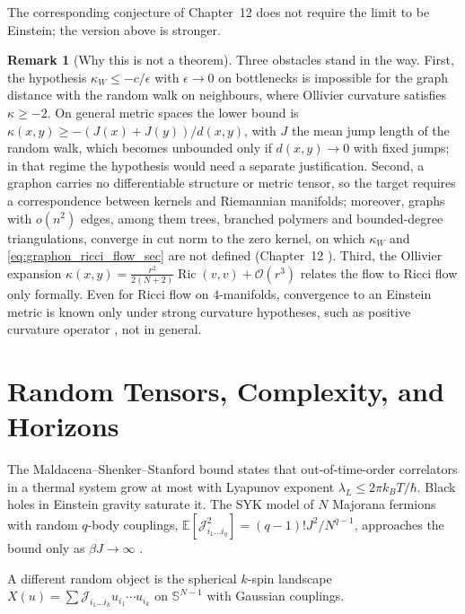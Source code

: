 \documentclass[11pt,a4paper,reqno]{amsart}
\theoremstyle{definition}
\newtheorem{remark}[theorem]{Remark}
\numberwithin{equation}{section}
\providecommand{\Sph}{\mathbb{S}}
\newcommand{\Ric}{\operatorname{Ric}}
\begin{document}
The corresponding conjecture of Chapter~12 does not require the limit to be Einstein; the version above is stronger.

\begin{remark}[Why this is not a theorem]
Three obstacles stand in the way. First, the hypothesis $\kappa_W \le -c/\epsilon$ with $\epsilon \to 0$ on bottlenecks is impossible for the graph distance with the random walk on neighbours, where Ollivier curvature satisfies $\kappa \ge -2$. On general metric spaces the lower bound is $\kappa(x,y) \ge -(J(x) + J(y))/d(x,y)$, with $J$ the mean jump length of the random walk, which becomes unbounded only if $d(x,y) \to 0$ with fixed jumps; in that regime the hypothesis would need a separate justification. Second, a graphon carries no differentiable structure or metric tensor, so the target requires a correspondence between kernels and Riemannian manifolds; moreover, graphs with $o(n^2)$ edges, among them trees, branched polymers and bounded-degree triangulations, converge in cut norm to the zero kernel, on which $\kappa_W$ and \eqref{eq:graphon_ricci_flow_sec} are not defined (Chapter~12 \cite{silvafilho2026grand}). Third, the Ollivier expansion $\kappa(x,y) = \frac{r^2}{2(N+2)}\Ric(v,v) + \mathcal{O}(r^3)$ \cite{ollivier2009ricci} relates the flow to Ricci flow only formally. Even for Ricci flow on $4$-manifolds, convergence to an Einstein metric is known only under strong curvature hypotheses, such as positive curvature operator \cite{hamilton1986}, not in general.
\end{remark}

\section{Random Tensors, Complexity, and Horizons}
\label{sec:horizon_scrambling}

The Maldacena--Shenker--Stanford bound \cite{maldacena2016bound} states that out-of-time-order correlators in a thermal system grow at most with Lyapunov exponent $\lambda_L \le 2\pi k_B T/\hbar$. Black holes in Einstein gravity saturate it. The SYK model \cite{sachdev1993, kitaev2015simple} of $N$ Majorana fermions with random $q$-body couplings, $\mathbb{E}[\mathcal{J}^2_{i_1\dots i_q}] = (q-1)!J^2/N^{q-1}$, approaches the bound only as $\beta J \to \infty$ \cite{maldacena2016remarks}.

A different random object is the spherical $k$-spin landscape $X(u) = \sum \mathcal{J}_{i_1 \dots i_k} u_{i_1}\cdots u_{i_k}$ on $\Sph^{N-1}$ with Gaussian couplings.
\end{document}
